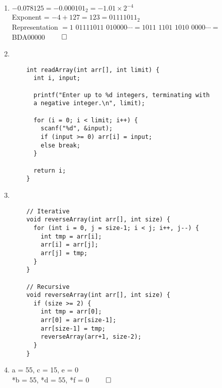 \documentclass[12pt, a4paper]{article}
\begin{document}
\begin{enumerate}[Q\arabic*.]
  \item $-0.078125 = -0.000101_2 = -1.01 \times 2^{-4}$\\
    Exponent = $-4 + 127 = 123 = 01111011_2$\\
    Representation $= 1$ $01111011$ $010000\cdots = 1011$ $1101$ $1010$ $0000\cdots =$ BDA00000 $\qed$

  \item \hfill\\ 
    \begin{lstlisting}
    int readArray(int arr[], int limit) {
      int i, input;

      printf("Enter up to %d integers, terminating with 
      a negative integer.\n", limit);

      for (i = 0; i < limit; i++) {
        scanf("%d", &input);
        if (input >= 0) arr[i] = input;
        else break;
      }

      return i;
    }
    \end{lstlisting}

  \pagebreak
  \item \hfill\\ 
    \begin{lstlisting}
    // Iterative
    void reverseArray(int arr[], int size) {
      for (int i = 0, j = size-1; i < j; i++, j--) {
        int tmp = arr[i];
        arr[i] = arr[j];
        arr[j] = tmp;
      }
    }

    // Recursive
    void reverseArray(int arr[], int size) {
      if (size >= 2) {
        int tmp = arr[0];
        arr[0] = arr[size-1];
        arr[size-1] = tmp;
        reverseArray(arr+1, size-2);
      }
    }
    \end{lstlisting}

  \item a = 55, c = 15, e = 0\\
*b = 55, *d = 55, *f = 0 $\qed$

\end{enumerate}
\end{document}
